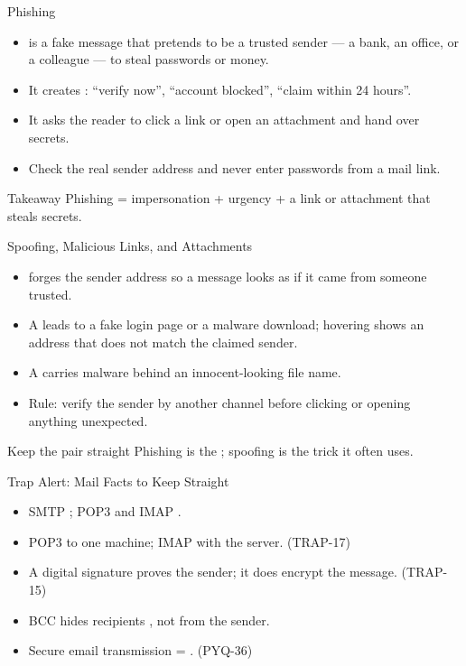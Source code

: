 \documentclass[aspectratio=169]{beamer}
\begin{document}
\begin{frame}{Phishing}
  \begin{itemize}
    \item {} is a fake message that pretends to be a trusted
      sender --- a bank, an office, or a colleague --- to steal
      passwords or money.
    \item It creates : ``verify now'', ``account blocked'',
      ``claim within 24 hours''.
    \item It asks the reader to click a link or open an attachment and
      hand over secrets.
    \item Check the real sender address and never enter passwords from a
      mail link.
  \end{itemize}
  \begin{alertblock}{Takeaway}
    Phishing = impersonation + urgency + a link or attachment that
    steals secrets.
  \end{alertblock}
\end{frame}

\begin{frame}{Spoofing, Malicious Links, and Attachments}
  \begin{itemize}
    \item {} forges the sender address so a message looks as
      if it came from someone trusted.
    \item A  leads to a fake login page or a
      malware download; hovering shows an address that does not match
      the claimed sender.
    \item A  carries malware behind an
      innocent-looking file name.
    \item Rule: verify the sender by another channel before clicking or
      opening anything unexpected.
  \end{itemize}
  \begin{block}{Keep the pair straight}
    Phishing is the ; spoofing is the  trick it often uses.
  \end{block}
\end{frame}

\begin{frame}{Trap Alert: Mail Facts to Keep Straight}
  \begin{itemize}
    \item SMTP ; POP3 and IMAP .
    \item POP3  to one machine; IMAP  with
      the server. (TRAP-17)
    \item A digital signature proves the sender; it does 
      encrypt the message. (TRAP-15)
    \item BCC hides recipients , not from the
      sender.
    \item Secure email transmission = . (PYQ-36)
  \end{itemize}
\end{frame}
\end{document}
